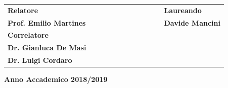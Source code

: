 \documentclass[twoside,openright,titlepage,headings,footinclude=true,cleardoublepage=empty,BCOR=5mm,11pt,a4paper,english]{book}
\begin{document}
\begin{titlepage}
\vspace{10mm}
\begin{spacing}{1.5}
\begin{tabular}{ l  c  c c c  cc c c c c  l }
{\Large{\bf Relatore}} &&&&&&&&&&& {\Large{\bf Laureando}}\\
{\Large{\bf Prof. Emilio Martines}} &&&&&&&&&&& {\Large{\bf Davide Mancini}}\\
{\Large{\bf Correlatore}}\\
{\Large{\bf Dr. Gianluca De Masi}}\\
{\Large{\bf Dr. Luigi Cordaro}}\\
\end{tabular}
\end{spacing}
\vspace{10 mm}

\begin{center}
{\Large{\bf Anno Accademico 2018/2019}}
\end{center}
\end{titlepage}
\clearpage{\pagestyle{empty}\cleardoublepage}


\tableofcontents

\pagestyle{headings}



\clearpage

\clearpage

\clearpage

\clearpage

\clearpage

\clearpage

\printbibliography
\end{document}
